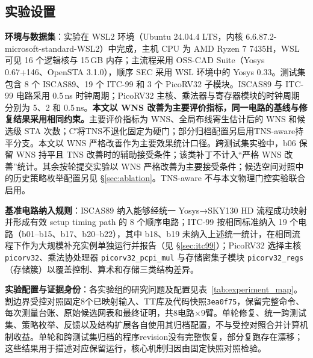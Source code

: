 \documentclass[twocolumn,10pt,fontset=windows]{ctexart}
\begin{document}
\subsection{实验设置}\label{sec:setup}

\textbf{环境与数据集}：实验在 WSL2 环境（Ubuntu 24.04.4 LTS，内核 6.6.87.2-microsoft-standard-WSL2）中完成，主机 CPU 为 AMD Ryzen 7 7435H，WSL 可见 16 个逻辑核与 15\,GB 内存；主流程采用 OSS-CAD Suite（Yosys 0.67+146、OpenSTA 3.1.0），顺序 SEC 采用 WSL 环境中的 Yosys 0.33。测试集包含 8 个 ISCAS89、19 个 ITC-99 和 3 个 PicoRV32 子模块。ISCAS89 与 ITC-99 电路采用 0.5\,ns 时钟周期；PicoRV32 主核、乘法器与寄存器模块的时钟周期分别为 5、2 和 0.5\,ns。\textbf{本文以 WNS 改善为主要评价指标，同一电路的基线与修复结果采用相同约束。}主要评价指标为 WNS、全局布线寄生估计后的 WNS 和候选级 STA 次数；C′将TNS不退化固定为硬门；部分归档配置另启用TNS-aware持平分支。本文以 WNS 严格改善作为主要效果统计口径。跨测试集实验中，b06 保留 WNS 持平且 TNS 改善时的辅助接受条件；该类补丁不计入“严格 WNS 改善”统计。其余按轮提交实验以 WNS 严格改善为主要接受条件；候选空间对照中的历史策略枚举配置另见 \S\ref{sec:ablation}。TNS-aware 不与本文物理门控实验联合启用。

\textbf{基准电路纳入规则}：ISCAS89 纳入能够经统一 Yosys→SKY130 HD 流程成功映射并形成有效 setup timing path 的 8 个顺序电路；ITC-99 按相同标准纳入 19 个电路（b01--b15、b17、b20--b22），其中 b18、b19 未纳入上述统一统计，在相同流程下作为大规模补充实例单独运行并报告（见 \S\ref{sec:itc99}）；PicoRV32 选择主核 \texttt{picorv32}、乘法协处理器 \texttt{picorv32\_pcpi\_mul} 与存储密集子模块 \texttt{picorv32\_regs}（存储簇）以覆盖控制、算术和存储三类结构差异。

\textbf{实验配置与证据身份}：各实验组的研究问题及配置见表~\ref{tab:experiment_map}。割边界受控对照固定8个已映射输入、TT库及代码快照\texttt{3ea0f75}，保留完整命令、每次测量台账、原始候选网表和最终证明，共8电路$\times$9臂。单轮修复、统一跨测试集、策略枚举、反馈以及结构扩展各自使用其归档配置，不与受控对照合并计算机制收益。单轮和跨测试集归档的程序revision没有完整恢复，部分复跑存在漂移；这些结果用于描述对应保留运行，核心机制归因由固定快照对照检验。
\end{document}

